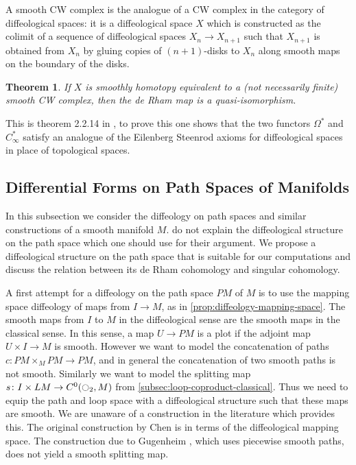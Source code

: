 \documentclass{scrartcl}
\theoremstyle{plain}
\newtheorem{theorem}{Theorem}[section]
\newtheorem{corollary}[theorem]{Corollary}
\theoremstyle{definition}
\newcommand{\injto}{\hookrightarrow}
\newcommand{\surjfrom}{\twoheadleftarrow}
\begin{document}
A smooth CW complex is the analogue of a CW complex in the category of diffeological spaces: it is a diffeological space $X$ which is constructed as the colimit of a sequence of diffeological spaces $X_n\to X_{n+1}$ such that $X_{n+1}$ is obtained from $X_n$ by gluing copies of $(n+1)$-disks to $X_n$ along smooth maps on the boundary of the disks. 
\begin{theorem}\label{thm:diffeological-de-rham-cw}
    If $X$ is smoothly homotopy equivalent to a (not necessarily finite) smooth CW complex, then the de Rham map is a quasi-isomorphism.
\end{theorem}
This is theorem 2.2.14 in \cite{gurer2014topologie}, to prove this one shows that the two functors $\Omega^*$ and $C^*_\infty$ satisfy an analogue of the Eilenberg Steenrod axioms for diffeological spaces in place of topological spaces. 




\subsection{Differential Forms on Path Spaces of Manifolds}\label{subsec:diffeological-path-spaces}

In this subsection we consider the diffeology on path spaces and similar constructions of a smooth manifold $M$. \cite{naef2019string} do not explain the diffeological structure on the path space which one should use for their argument. We propose a diffeological structure on the path space that is suitable for our computations and discuss the relation between its de Rham cohomology and singular cohomology. 

A first attempt for a diffeology on the path space $PM$ of $M$ is to use the mapping space diffeology of maps from $I\to M$, as in \cref{prop:diffeology-mapping-space}. The smooth maps from $I$ to $M$ in the diffeological sense are the smooth maps in the classical sense. In this sense, a map $U\to PM$ is a plot if the adjoint map $U\times I\to M$ is smooth. However we want to model the concatenation of paths $c\colon PM\times_M PM\to PM$, and in general the concatenation of two smooth paths is not smooth. Similarly we want to model the splitting map $s\colon I\times LM\to C^0(\ocircle_2, M)$ from \cref{subsec:loop-coproduct-classical}. Thus we need to equip the path and loop space with a diffeological structure such that these maps are smooth. We are unaware of a construction in the literature which provides this. The original construction by Chen \cite{chen1977iterated} is in terms of the diffeological mapping space. The construction due to Gugenheim \cite{gugenheim1977chen}, which uses piecewise smooth paths, does not yield a smooth splitting map.
\end{document}
